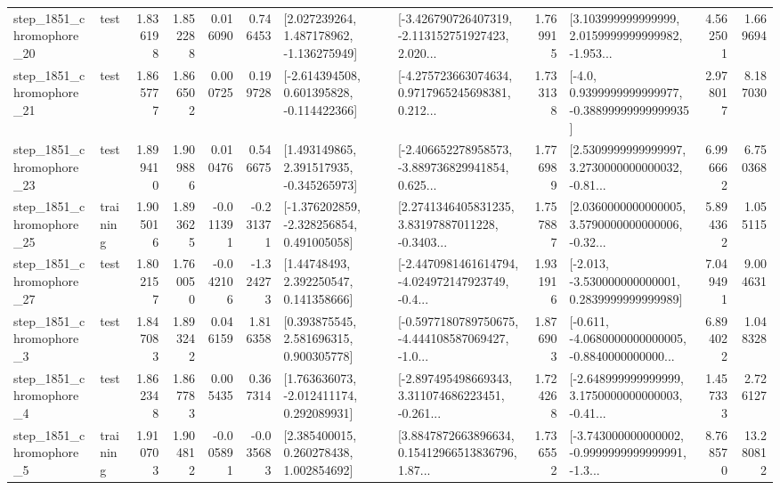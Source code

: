 \begin{tabular}{llrrrrllrlrr}
 step\_1851\_chromophore\_20 &      test &      1.836198 &    1.852288 &      0.016090 &  0.746453 &    [2.027239264, 1.487178962, -1.136275949] &  [-3.426790726407319, -2.113152751927423, 2.020... &       1.769915 &  [3.103999999999999, 2.0159999999999982, -1.953... &            4.562501 &          1.669694 \\
 step\_1851\_chromophore\_21 &      test &      1.865777 &    1.866502 &      0.000725 &  0.199728 &   [-2.614394508, 0.601395828, -0.114422366] &  [-4.275723663074634, 0.9717965245698381, 0.212... &       1.733138 &   [-4.0, 0.9399999999999977, -0.38899999999999935] &            2.978017 &          8.187030 \\
 step\_1851\_chromophore\_23 &      test &      1.899410 &    1.909886 &      0.010476 &  0.546675 &    [1.493149865, 2.391517935, -0.345265973] &  [-2.406652278958573, -3.889736829941854, 0.625... &       1.776989 &  [2.5309999999999997, 3.2730000000000032, -0.81... &            6.996662 &          6.750368 \\
 step\_1851\_chromophore\_25 &  training &      1.905016 &    1.893625 &     -0.011391 & -0.231371 &   [-1.376202859, -2.328256854, 0.491005058] &  [2.2741346405831235, 3.83197887011228, -0.3403... &       1.757887 &  [2.0360000000000005, 3.5790000000000006, -0.32... &            5.894362 &          1.055115 \\
 step\_1851\_chromophore\_27 &      test &      1.802157 &    1.760050 &     -0.042106 & -1.324273 &      [1.44748493, 2.392250547, 0.141358666] &  [-2.4470981461614794, -4.024972147923749, -0.4... &       1.931916 &   [-2.013, -3.530000000000001, 0.2839999999999989] &            7.049491 &          9.004631 \\
  step\_1851\_chromophore\_3 &      test &      1.847083 &    1.893242 &      0.046159 &  1.816358 &     [0.393875545, 2.581696315, 0.900305778] &  [-0.5977180789750675, -4.444108587069427, -1.0... &       1.876903 &  [-0.611, -4.0680000000000005, -0.8840000000000... &            6.894022 &          1.048328 \\
  step\_1851\_chromophore\_4 &      test &      1.862348 &    1.867783 &      0.005435 &  0.367314 &    [1.763636073, -2.012411174, 0.292089931] &  [-2.897495498669343, 3.311074686223451, -0.261... &       1.724268 &  [-2.648999999999999, 3.1750000000000003, -0.41... &            1.457333 &          2.726127 \\
  step\_1851\_chromophore\_5 &  training &      1.910703 &    1.904812 &     -0.005891 & -0.035683 &     [2.385400015, 0.260278438, 1.002854692] &  [3.8847872663896634, 0.15412966513836796, 1.87... &       1.736552 &  [-3.743000000000002, -0.9999999999999991, -1.3... &            8.768570 &         13.280812 \\

\end{tabular}
